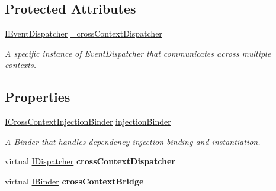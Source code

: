 \subsection*{Protected Attributes}
\begin{DoxyCompactItemize}
\item 
\hyperlink{interfacestrange_1_1extensions_1_1dispatcher_1_1eventdispatcher_1_1api_1_1_i_event_dispatcher}{I\-Event\-Dispatcher} \hyperlink{classstrange_1_1extensions_1_1context_1_1impl_1_1_cross_context_a00c68512ad80d15236954614f223820e}{\-\_\-cross\-Context\-Dispatcher}
\begin{DoxyCompactList}\small\item\em A specific instance of Event\-Dispatcher that communicates across multiple contexts. \end{DoxyCompactList}\end{DoxyCompactItemize}
\subsection*{Properties}
\begin{DoxyCompactItemize}
\item 
\hypertarget{classstrange_1_1extensions_1_1context_1_1impl_1_1_cross_context_aa9e5959a8c384f30821f024a6342da1d}{\hyperlink{interfacestrange_1_1extensions_1_1injector_1_1api_1_1_i_cross_context_injection_binder}{I\-Cross\-Context\-Injection\-Binder} \hyperlink{classstrange_1_1extensions_1_1context_1_1impl_1_1_cross_context_aa9e5959a8c384f30821f024a6342da1d}{injection\-Binder}}\label{classstrange_1_1extensions_1_1context_1_1impl_1_1_cross_context_aa9e5959a8c384f30821f024a6342da1d}

\begin{DoxyCompactList}\small\item\em A Binder that handles dependency injection binding and instantiation. \end{DoxyCompactList}\item 
\hypertarget{classstrange_1_1extensions_1_1context_1_1impl_1_1_cross_context_aa020f2f7a4dbc95dd6df440197d0349e}{virtual \hyperlink{interfacestrange_1_1extensions_1_1dispatcher_1_1api_1_1_i_dispatcher}{I\-Dispatcher} {\bfseries cross\-Context\-Dispatcher}}\label{classstrange_1_1extensions_1_1context_1_1impl_1_1_cross_context_aa020f2f7a4dbc95dd6df440197d0349e}

\item 
\hypertarget{classstrange_1_1extensions_1_1context_1_1impl_1_1_cross_context_acaa1de297f6c13a502f384a5cb20b596}{virtual \hyperlink{interfacestrange_1_1framework_1_1api_1_1_i_binder}{I\-Binder} {\bfseries cross\-Context\-Bridge}}\label{classstrange_1_1extensions_1_1context_1_1impl_1_1_cross_context_acaa1de297f6c13a502f384a5cb20b596}

\end{DoxyCompactItemize}
